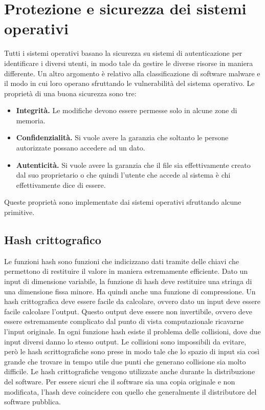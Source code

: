 \documentclass[a4paper]{article}
\begin{document}
\section{Protezione e sicurezza dei sistemi operativi}
Tutti i sistemi operativi basano la sicurezza su sistemi di autenticazione per identificare i diversi utenti, in modo tale da gestire le diverse risorse in maniera differente. Un altro argomento è relativo alla classificazione di software malware e il modo in cui loro operano sfruttando le vulnerabilità del sistema operativo. Le proprietà di una buona sicurezza sono tre:
\begin{itemize}
    \item \textbf{Integrità.} Le modifiche devono essere permesse solo in alcune zone di memoria.
    \item \textbf{Confidenzialità.} Si vuole avere la garanzia che soltanto le persone autorizzate possano accedere ad un dato.
    \item \textbf{Autenticità.} Si vuole avere la garanzia che il file sia effettivamente creato dal suo proprietario o che quindi l'utente che accede al sistema è chi effettivamente dice di essere.
\end{itemize}

Queste proprietà sono implementate dai sistemi operativi sfruttando alcune primitive.

\subsection{Hash crittografico}
Le funzioni hash sono funzioni che indicizzano dati tramite delle chiavi che permettono di restituire il valore in maniera estremamente efficiente. Dato un input di dimensione variabile, la funzione di hash deve restituire una stringa di una dimensione fissa minore. Ha quindi anche una funzione di compressione. Un hash crittografica deve essere facile da calcolare, ovvero dato un input deve essere facile calcolare l'output. Questo output deve essere non invertibile, ovvero deve essere estremamente complicato dal punto di vista computazionale ricavarne l'input originale. In ogni funzione hash esiste il problema delle collisioni, dove due input diversi danno lo stesso output. Le collisioni sono impossibili da evitare, però le hash scrittografiche sono prese in modo tale che lo spazio di input sia così grande che trovare in tempo utile due punti che generano collisione sia molto difficile. Le hash crittografiche vengono utilizzate anche durante la distribuzione del software. Per essere sicuri che il software sia una copia originale e non modificata, l'hash deve coincidere con quello che generalmente il distributore del software pubblica.
\end{document}
